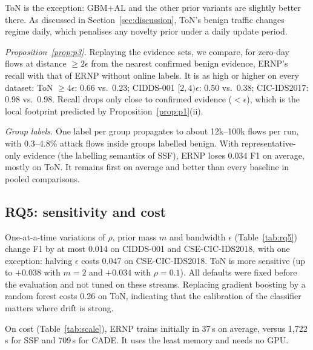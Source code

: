 \documentclass[preprint,12pt]{elsarticle}
\begin{document}
ToN is the exception: GBM+AL and the other prior variants are slightly better there. As discussed in Section~\ref{sec:discussion}, ToN's benign traffic changes regime daily, which penalises any novelty prior under a daily update period.

\emph{Proposition~\ref{prop:p3}.} Replaying the evidence sets, we compare, for zero-day flows at distance $\ge 2\epsilon$ from the nearest confirmed benign evidence, ERNP's recall with that of ERNP without online labels. It is as high or higher on every dataset: ToN $\ge4\epsilon$: 0.66 vs.\ 0.23; CIDDS-001 $[2,4)\epsilon$: 0.50 vs.\ 0.38; CIC-IDS2017: 0.98 vs.\ 0.98. Recall drops only close to confirmed evidence ($<\epsilon$), which is the local footprint predicted by Proposition~\ref{prop:p1}(ii).

\emph{Group labels.} One label per group propagates to about 12k--100k flows per run, with 0.3--4.8\% attack flows inside groups labelled benign. With representative-only evidence (the labelling semantics of SSF), ERNP loses 0.034 F1 on average, mostly on ToN. It remains first on average and better than every baseline in pooled comparisons.

\begin{table}[t]
\centering\small
\caption{RQ4: $\Delta$F1 of each variant relative to ERNP (five seeds).}\label{tab:rq4}
\resizebox{\linewidth}{!}{}
\end{table}

\subsection{RQ5: sensitivity and cost}\label{sec:rq5}
One-at-a-time variations of $\rho$, prior mass $m$ and bandwidth $\epsilon$ (Table~\ref{tab:rq5}) change F1 by at most 0.014 on CIDDS-001 and CSE-CIC-IDS2018, with one exception: halving $\epsilon$ costs 0.047 on CSE-CIC-IDS2018. ToN is more sensitive (up to $+0.038$ with $m=2$ and $+0.034$ with $\rho=0.1$). All defaults were fixed before the evaluation and not tuned on these streams. Replacing gradient boosting by a random forest costs 0.26 on ToN, indicating that the calibration of the classifier matters where drift is strong.

On cost (Table~\ref{tab:scale}), ERNP trains initially in 37\,s on average, versus 1,722\,s for SSF and 709\,s for CADE. It uses the least memory and needs no GPU.

\begin{table}[t]
\centering\small
\caption{RQ5: $\Delta$F1 relative to the default configuration (seeds 0--2).}\label{tab:rq5}

\end{table}
\end{document}
